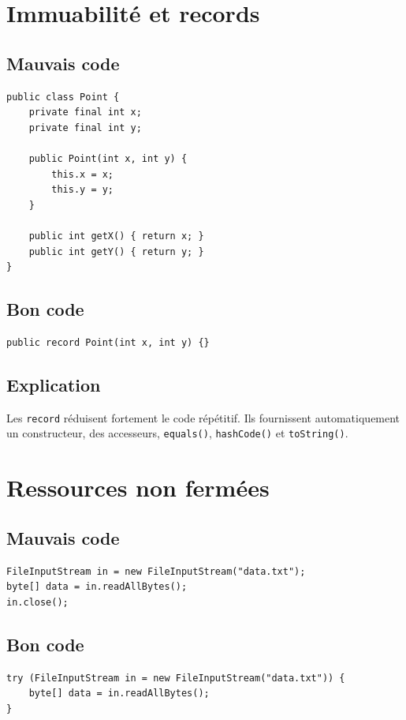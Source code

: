 \documentclass[a4paper,11pt]{report}
\begin{document}
\chapter{Immuabilité et records}

\section{Mauvais code}
\begin{lstlisting}
public class Point {
    private final int x;
    private final int y;

    public Point(int x, int y) {
        this.x = x;
        this.y = y;
    }

    public int getX() { return x; }
    public int getY() { return y; }
}
\end{lstlisting}

\section{Bon code}
\begin{lstlisting}
public record Point(int x, int y) {}
\end{lstlisting}

\section{Explication}
Les \texttt{record} réduisent fortement le code répétitif.
Ils fournissent automatiquement un constructeur, des accesseurs, \texttt{equals()}, \texttt{hashCode()} et \texttt{toString()}.

\chapter{Ressources non fermées}

\section{Mauvais code}
\begin{lstlisting}
FileInputStream in = new FileInputStream("data.txt");
byte[] data = in.readAllBytes();
in.close();
\end{lstlisting}

\section{Bon code}
\begin{lstlisting}
try (FileInputStream in = new FileInputStream("data.txt")) {
    byte[] data = in.readAllBytes();
}
\end{lstlisting}
\end{document}
